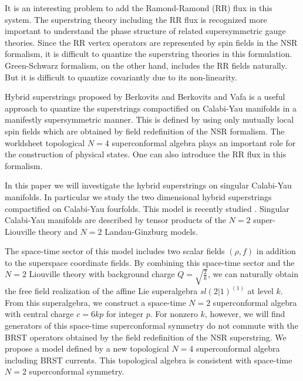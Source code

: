 \documentclass[a4paper,12pt]{article}
\begin{document}
It is an interesting problem to add the 
Ramond-Ramond (RR) flux in this system.
The superstring theory including the RR flux is recognized more
important to understand the phase structure of related supersymmetric
gauge theories\cite{Va}. 
Since the RR vertex operators are represented by spin fields in the 
NSR formalism, it is difficult  to quantize the superstring theories
in this formulation.
Green-Schwarz formalism, on the other hand, includes the RR fields
naturally. But it is difficult to quantize covariantly due to its 
non-linearity.

Hybrid superstrings proposed by Berkovits \cite{Be} and Berkovits and
Vafa \cite{BeVa}
is a useful approach to quantize the superstrings compactified on 
Calabi-Yau manifolds in a manifestly supersymmetric manner.
This is defined by using only mutually local spin fields which are 
obtained by field redefinition of the NSR formalism.
The worldsheet topological $N=4$ superconformal algebra plays an
important role for the construction of physical states.
One can also introduce the RR flux in this formalism\cite{BeVaWi}.

In this paper we will investigate the hybrid superstrings on singular
Calabi-Yau
manifolds. In particular we study the two dimensional hybrid
superstrings
compactified on Calabi-Yau fourfolds. This model is recently studied
\cite{BeGuVa}.
Singular Calabi-Yau manifolds are described by tensor products of the
$N=2$ 
super-Liouville theory and $N=2$ Landau-Ginzburg models.

The space-time sector of this model includes two scalar fields
$(\rho,f)$
in addition to the superspace coordinate fields.  By combining this
space-time
sector and the $N=2$ Liouville theory with background charge
$Q=\sqrt{\frac{2}{k}}$,
we can naturally obtain the free field realization of the affine Lie
superalgebra
$sl(2|1)^{(1)}$ at level $k$. From this superalgebra, we construct a
space-time
$N=2$ superconformal algebra with central charge $c=6kp$ for integer
$p$.
For nonzero $k$, however, we will find generators of this space-time
superconformal
symmetry do not commute with the BRST operators obtained by the field
redefinition of
the NSR superstring. We propose a model defined by a new topological
$N=4$ superconformal
algebra including BRST currents. This topological algebra is consistent
with space-time
$N=2$ superconformal symmetry.
\end{document}
